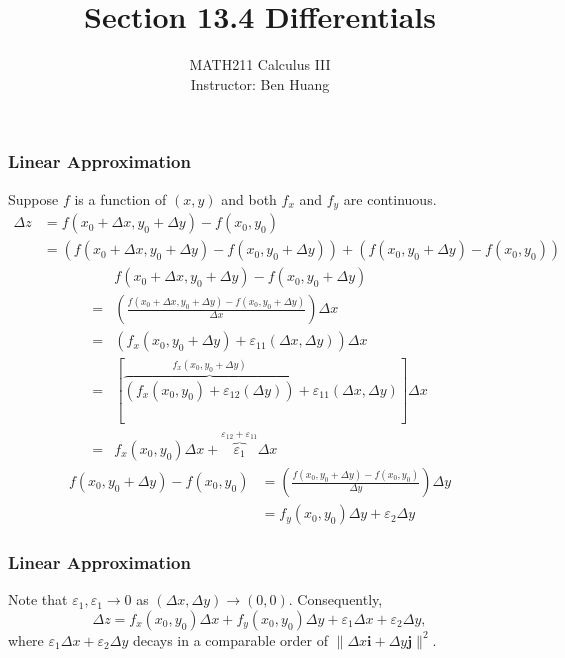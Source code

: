 \documentclass[10pt]{beamer}
\author[B.H.]{{\Large MATH211 Calculus III}\\\vspace{6pt}Instructor: Ben Huang}
\date{}
\title[Section 14.3]{Section 13.4 Differentials}
\institute[MU]{\texttt{[image: MCLogo-Bck.png]}}
\newcommand{\norm}[1]{\lVert#1\rVert}
\begin{document}
\frame{\titlepage}

\begin{frame}
\frametitle{Linear Approximation}
\small
Suppose \(f\) is a function of \((x,y)\) and both \(f_x\) and \(f_y\) are continuous.
\begin{align*}
\Delta z &= f(x_0+\Delta x, y_0 + \Delta y) - f(x_0,y_0)\\
& = \left(f(x_0+\Delta x, y_0 + \Delta y) - f(x_0, y_0+\Delta y)\right) + \left(f(x_0, y_0+\Delta y) - f(x_0,y_0)\right)
\end{align*}
\begin{align*}
&f(x_0+\Delta x, y_0 + \Delta y) - f(x_0, y_0+\Delta y)\\  
= &\left(\frac{
f(x_0+\Delta x, y_0 + \Delta y) - f(x_0, y_0+\Delta y) }{\Delta x}\right)\Delta x\\
=&\left(f_x(x_0, y_0+\Delta y) + \varepsilon_{11}(\Delta x, \Delta y)\right)\Delta x\\
=&\left[\overbrace{\left(f_x(x_0, y_0) +\varepsilon_{12}(\Delta y)\right)}^{f_x(x_0, y_0+\Delta y)} + \varepsilon_{11}(\Delta x, \Delta y)\right]\Delta x\\
=&f_x(x_0,y_0)\Delta x + \overbrace{\varepsilon_1}^{\varepsilon_{12} + \varepsilon_{11}}\Delta x
\end{align*}
\begin{align*}
f(x_0, y_0+\Delta y) - f(x_0,y_0)&=\left(\frac{f(x_0, y_0+\Delta y) - f(x_0,y_0)}{\Delta y}\right)\Delta y\\
&=f_y(x_0,y_0)\Delta y + \varepsilon_2\Delta y
\end{align*}
\end{frame}

\begin{frame}
\frametitle{Linear Approximation}
Note that $\varepsilon_1, \varepsilon_1 \to 0$ as $(\Delta x, \Delta y)\to (0,0)$. Consequently, 
\[
\Delta z = f_x(x_0,y_0)\Delta x + f_y(x_0,y_0)\Delta y + \varepsilon_1\Delta x + \varepsilon_2\Delta y,
\]
where \(\varepsilon_1\Delta x + \varepsilon_2\Delta y\) decays in a comparable order of $\norm{\Delta x\mathbf i + \Delta y\mathbf j}^2$.
\end{frame}
\end{document}
